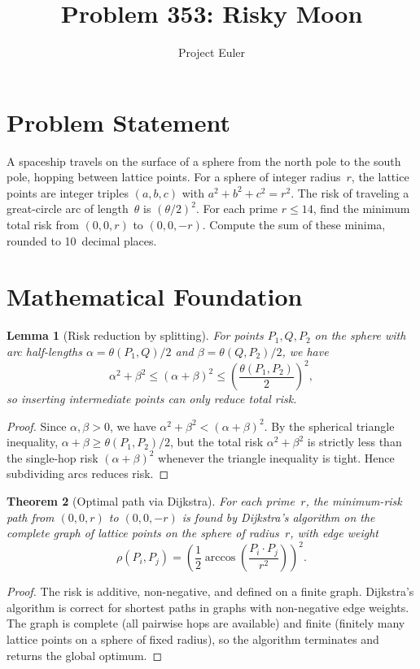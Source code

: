 \documentclass[a4paper,12pt]{article}
\title{Problem 353: Risky Moon}
\author{Project Euler}
\date{}
\newtheorem{theorem}{Theorem}
\newtheorem{lemma}[theorem]{Lemma}
\begin{document}
\maketitle

\section{Problem Statement}

A spaceship travels on the surface of a sphere from the north pole to the south pole, hopping between lattice points. For a sphere of integer radius~$r$, the lattice points are integer triples $(a,b,c)$ with $a^2+b^2+c^2 = r^2$. The risk of traveling a great-circle arc of length~$\theta$ is $(\theta/2)^2$. For each prime $r \le 14$, find the minimum total risk from $(0,0,r)$ to $(0,0,-r)$. Compute the sum of these minima, rounded to 10~decimal places.

\section{Mathematical Foundation}

\begin{lemma}[Risk reduction by splitting]
For points $P_1, Q, P_2$ on the sphere with arc half-lengths $\alpha = \theta(P_1,Q)/2$ and $\beta = \theta(Q,P_2)/2$, we have
\[
\alpha^2 + \beta^2 \le (\alpha + \beta)^2 \le \left(\frac{\theta(P_1,P_2)}{2}\right)^2\!,
\]
so inserting intermediate points can only reduce total risk.
\end{lemma}

\begin{proof}
Since $\alpha, \beta > 0$, we have $\alpha^2 + \beta^2 < (\alpha+\beta)^2$. By the spherical triangle inequality, $\alpha + \beta \ge \theta(P_1,P_2)/2$, but the total risk $\alpha^2 + \beta^2$ is strictly less than the single-hop risk $(\alpha+\beta)^2$ whenever the triangle inequality is tight. Hence subdividing arcs reduces risk.
\end{proof}

\begin{theorem}[Optimal path via Dijkstra]
For each prime~$r$, the minimum-risk path from $(0,0,r)$ to $(0,0,-r)$ is found by Dijkstra's algorithm on the complete graph of lattice points on the sphere of radius~$r$, with edge weight
\[
\rho(P_i, P_j) = \left(\frac{1}{2}\arccos\!\left(\frac{P_i \cdot P_j}{r^2}\right)\right)^{\!2}.
\]
\end{theorem}

\begin{proof}
The risk is additive, non-negative, and defined on a finite graph. Dijkstra's algorithm is correct for shortest paths in graphs with non-negative edge weights. The graph is complete (all pairwise hops are available) and finite (finitely many lattice points on a sphere of fixed radius), so the algorithm terminates and returns the global optimum.
\end{proof}
\end{document}
